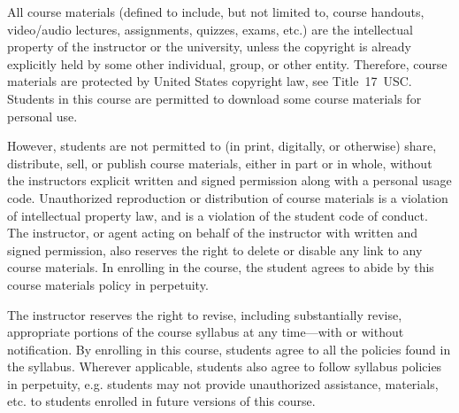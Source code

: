 \documentclass[11pt,letterpaper]{article}
\begin{document}
All course materials (defined to include, but not limited to, course handouts, video/audio lectures, assignments, quizzes, exams, etc.) are the intellectual property of the instructor or the university, unless the copyright is already explicitly held by some other individual, group, or other entity. Therefore, course materials are protected by United States copyright law, see Title~17~USC. Students in this course are permitted to download some course materials for personal use. \pspace

However, students are not permitted to (in print, digitally, or otherwise) share, distribute, sell, or publish course materials, either in part or in whole, without the instructors explicit written and signed permission along with a personal usage code. Unauthorized reproduction or distribution of course materials is a violation of intellectual property law, and is a violation of the student code of conduct. The instructor, or agent acting on behalf of the instructor with written and signed permission, also reserves the right to delete or disable any link to any course materials. In enrolling in the course, the student agrees to abide by this course materials policy in perpetuity.
\sectionbreak




The instructor reserves the right to revise, including substantially revise, appropriate portions of the course syllabus at any time---with or without notification. By enrolling in this course, students agree to all the policies found in the syllabus. Wherever applicable, students also agree to follow syllabus policies in perpetuity, e.g. students may not provide unauthorized assistance, materials, etc. to students enrolled in future versions of this course. 
\sectionbreak



\end{document}
